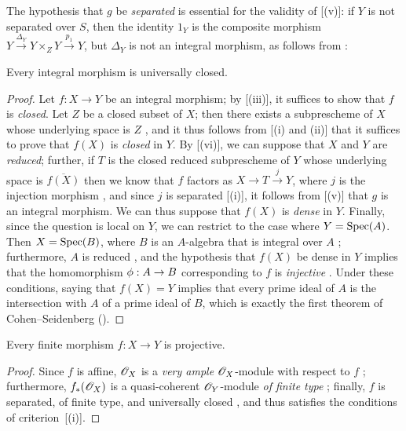 \begin{remark}[6.1.9]
\label{II.6.1.9}
The hypothesis that $g$ be \emph{separated} is essential for the validity of [(v)]: if $Y$ is not separated over $S$, then the identity $1_Y$ is the composite morphism $Y\xrightarrow{\Delta_Y}Y\times_Z Y\xrightarrow{p_1}Y$, but $\Delta_Y$ is not an integral morphism, as follows from :
\end{remark}

\begin{proposition}[6.1.10]
\label{II.6.1.10}
Every integral morphism is universally closed.
\end{proposition}

\begin{proof}
Let $f:X\to Y$ be an integral morphism;
by [(iii)], it suffices to show that $f$ is \emph{closed}.
Let $Z$ be a closed subset of $X$;
then there exists a subprescheme of $X$ whose underlying space is $Z$ , and it thus follows from [(i) and (ii)] that it suffices to prove that $f(X)$ is \emph{closed} in $Y$.
By [(vi)], we can suppose that $X$ and $Y$ are \emph{reduced};
further, if $T$ is the closed reduced subprescheme of $Y$ whose underlying space is $\overline{f(X)}$  then we know that $f$ factors as $X\to T\xrightarrow{j}Y$, where $j$ is the injection morphism , and since $j$ is separated [(i)], it follows from [(v)] that $g$ is an integral morphism.
We can thus suppose that $f(X)$ is \emph{dense} in $Y$.
Finally, since the question is local on $Y$, we can restrict to the case where $Y=\operatorname{Spec}(A)$.
Then $X=\operatorname{Spec}(B)$, where $B$ is an $A$-algebra that is integral over $A$ ;
furthermore, $A$ is reduced , and the hypothesis that $f(X)$ be dense in $Y$ implies that the homomorphism $\vphi:A\to B$ corresponding to $f$ is \emph{injective} .
Under these conditions, saying that $f(X)=Y$ implies that every prime ideal of $A$ is the intersection with $A$ of a prime ideal of $B$, which is exactly the first theorem of Cohen--Seidenberg (\cite[t.~I, p.~257, th.~3]{(II-13)}).
\end{proof}

\begin{corollary}[6.1.11]
\label{II.6.1.11}
Every finite morphism $f:X\to Y$ is projective.
\end{corollary}

\begin{proof}
Since $f$ is affine, $\mathscr{O}_X$ is a \emph{very ample} $\mathscr{O}_X$-module with respect to $f$ ;
furthermore, $f_*(\mathscr{O}_X)$ is a quasi-coherent $\mathscr{O}_Y$-module \emph{of finite type} ;
finally, $f$ is separated, of finite type, and universally closed , and thus satisfies the conditions of criterion~[(i)].
\end{proof}

